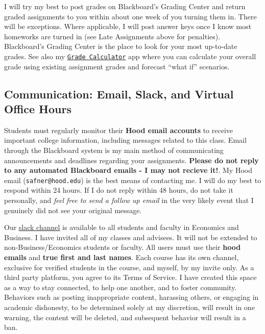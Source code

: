 \documentclass{article}
\begin{document}
I will try my best to post grades on Blackboard's Grading Center and
return graded assignments to you within about one week of you turning
them in. There will be exceptions. Where applicable, I will post answer
keys once I know most homeworks are turned in (see Late Assignments
above for penalties). Blackboard's Grading Center is the place to look
for your most up-to-date grades. See also my
\href{https://ryansafner.shinyapps.io/306_grade_calculator/}{
\texttt{Grade\ Calculator}} app where you can calculate your overall
grade using existing assignment grades and forecast ``what if''
scenarios.

\hypertarget{communication-email-slack-and-virtual-office-hours}{%
\subsection{Communication: Email, Slack, and Virtual Office
Hours}\label{communication-email-slack-and-virtual-office-hours}}

Students must regularly monitor their \textbf{Hood email accounts} to
receive important college information, including messages related to
this class. Email through the Blackboard system is my main method of
communicating announcements and deadlines regarding your assignments.
\textbf{Please do not reply to any automated Blackboard emails - I may
not recieve it!}. My Hood email (\texttt{safner@hood.edu}) is the best
means of contacting me. I will do my best to respond within 24 hours. If
I do not reply within 48 hours, do not take it personally, and
\emph{feel free to send a follow up email} in the very likely event that
I genuinely did not see your original message.

Our \href{https://hoodcollegeeconomics.slack.com}{slack channel} is
available to all students and faculty in Economics and Business. I have
invited all of my classes and advisees. It will not be extended to
non-Business/Economics students or faculty. All users must use their
\textbf{hood emails} and \textbf{true first and last names}. Each course
has its own channel, exclusive for verified students in the course, and
myself, by my invite only. As a third party platform, you agree to its
Terms of Service. I have created this space as a way to stay connected,
to help one another, and to foster community. Behaviors such as posting
inappropriate content, harassing others, or engaging in academic
dishonesty, to be determined solely at my discretion, will result in one
warning, the content will be deleted, and subsequent behavior will
result in a ban.
\end{document}
